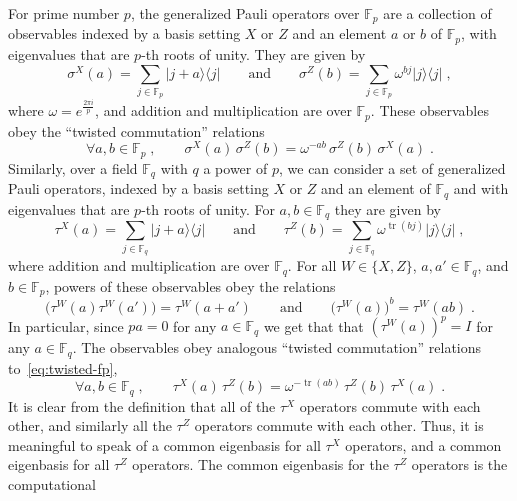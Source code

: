 \documentclass[11pt]{article}
\theoremstyle{definition}
\newcommand{\ket}[1]{|#1\rangle}
\newcommand{\bra}[1]{\langle#1|}
\newcommand{\qp}{\tau}
\newcommand{\F}{\ensuremath{\mathbb{F}}}
\newcommand{\Fp}{\F_p}
\newcommand{\Fq}{\F_q}
\DeclareMathOperator{\tr}{tr}
\begin{document}
For prime number $p$, the generalized Pauli operators over $\Fp$ are a
collection of observables indexed by a basis setting $X$ or $Z$ and an element
$a$ or $b$ of $\Fp$, with eigenvalues that are $p$-th roots of unity.
They are given by
\begin{equation}
  \label{eq:pauli-fp}
  \sigma^X(a) = \sum_{j \in \Fp} \ket{j + a} \bra{j}\qquad \text{and} \qquad
  \sigma^Z(b) = \sum_{j \in \Fp} \omega^{bj} \ket{j} \bra{j}\;,
\end{equation}
where $\omega = e^{\frac{2\pi i}{p}}$, and addition and multiplication are over
$\Fp$.
These observables obey the ``twisted commutation'' relations
\begin{equation}
  \label{eq:twisted-fp}
  \forall a,b\in\Fp\;,\qquad \sigma^X(a)\, \sigma^Z(b) =
  \omega^{-ab} \,\sigma^Z(b)\,\sigma^X(a)\;.
\end{equation}
Similarly, over a field $\Fq$ with $q$ a power of $p$, we can consider a set of generalized Pauli
operators, indexed by a basis setting $X$ or $Z$ and an element of $\Fq$ and
with eigenvalues that are $p$-th roots of unity.
For $a, b\in\Fq$ they are given by
\begin{equation*}
  \qp^X(a) = \sum_{j \in \Fq} \ket{j+a}\bra{j} \qquad \text{and} \qquad
  \qp^Z(b)= \sum_{j \in \Fq} \omega^{\tr(b j)} \ket{j}\bra{j}\;,
\end{equation*}
where addition and multiplication are over $\Fq$.
For all $W \in \{X,Z\}$, $a, a' \in \Fq$, and $b \in \Fp$, powers of these
observables obey the relations
\begin{equation*}\label{eq:pauli-product-power}
  \bigl(\qp^W(a)\qp^W(a')\bigr) = \qp^W(a+a') \qquad \text{and}
  \qquad \bigl( \qp^W(a) \bigr)^b = \qp^W(a b) \;.
\end{equation*}
In particular, since $pa=0$ for any $a\in \Fq$ we get that that $(\qp^W(a))^p =
I$ for any $a\in\Fq$.
The observables obey analogous ``twisted commutation'' relations
to~\eqref{eq:twisted-fp},
\begin{equation}
  \label{eq:twisted-fq}
  \forall a, b \in \Fq\;, \qquad \qp^X(a)\, \qp^Z(b) =
  \omega^{-\tr(a b)} \, \qp^Z(b)\, \qp^X(a)\;.
\end{equation}
It is clear from the definition that all of the $\qp^X$ operators commute with
each other, and similarly all the $\qp^Z$ operators commute with each other.
Thus, it is meaningful to speak of a common eigenbasis for all $\qp^X$
operators, and a common eigenbasis for all $\qp^Z$ operators.
The common eigenbasis for the $\qp^Z$ operators is the computational
\end{document}
